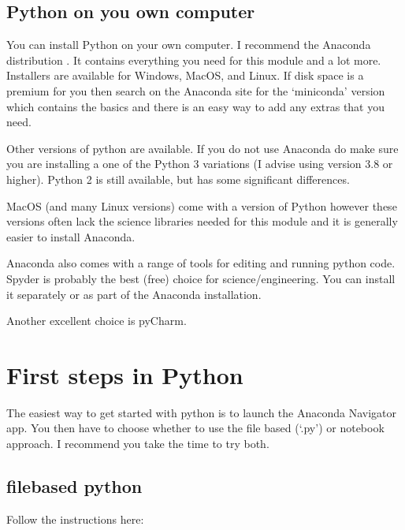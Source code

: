 \documentclass[letterpaper,10pt,english]{jupyterBook}
\begin{document}
\section{Python on you own computer}
\label{\detokenize{GettingStarted:python-on-you-own-computer}}
\sphinxAtStartPar
You can install Python on your own computer. I recommend the Anaconda distribution . It contains everything you need for this module and a lot more. Installers are available for Windows, MacOS, and Linux. If disk space is a premium for you then search on the Anaconda site for the ‘miniconda’ version which contains the basics and there is an easy way to add any extras that you need.

\sphinxAtStartPar
Other versions of python are available. If you do not use Anaconda do make sure you are installing a one of the Python 3 variations (I advise using version 3.8 or higher). Python 2 is still available, but has some significant differences.

\sphinxAtStartPar
MacOS (and many Linux versions) come with a version of Python however these versions often lack the science libraries needed for this module and it is generally easier to install Anaconda.

\sphinxAtStartPar
Anaconda also comes with a range of tools for editing and running python code. Spyder is probably the best (free) choice for science/engineering. You can install it separately or as part of the Anaconda installation.

\sphinxAtStartPar
Another excellent choice is pyCharm.


\chapter{First steps in Python}
\label{\detokenize{GettingStarted:first-steps-in-python}}
\sphinxAtStartPar
The easiest way to get started with python is to launch the Anaconda Navigator app. You then have to choose whether to use the file based (‘.py’) or notebook approach. I recommend you take the time to try both.


\section{file\sphinxhyphen{}based python}
\label{\detokenize{GettingStarted:file-based-python}}
\sphinxAtStartPar
Follow the instructions here: 
\end{document}
